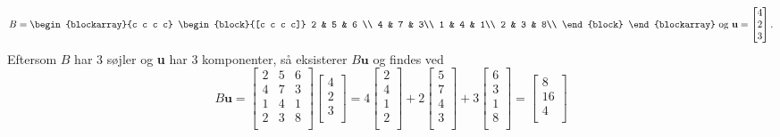 \begin{eks}\label{Matrix-vektor}
\begin{center} 
$$B=
\begin{blockarray}{c c c c}
\begin{block}{[c c c c]}
2 & 5 & 6 \\
4 & 7 & 3\\
1 & 4 & 1\\
2 & 3 & 8\\
\end{block}
\end{blockarray}
%
\text{ og }
%
\textbf{u}=
\begin{bmatrix}
4 \\
2 \\
3 \\ 
\end{bmatrix}.
$$
Eftersom $B$ har 3 søjler og \textbf{u} har 3 komponenter, så eksisterer $B\textbf{u}$ og findes ved
$$
B\textbf{u}=
\begin{bmatrix}
2 & 5 & 6 \\
4 & 7 & 3\\
1 & 4 & 1\\
2 & 3 & 8\\
\end{bmatrix}
\begin{bmatrix}
4 \\
2 \\
3 \\ 
\end{bmatrix}
=4
\begin{bmatrix}
2\\
4\\
1\\
2\\
\end{bmatrix}
+2
\begin{bmatrix}
5\\
7\\
4\\
3\\
\end{bmatrix}
+3
\begin{bmatrix}
6\\
3\\
1\\
8\\
\end{bmatrix}
=
\begin{bmatrix}
8\\
16\\
4\\

\end{bmatrix}$$
\end{center}
\end{eks}
